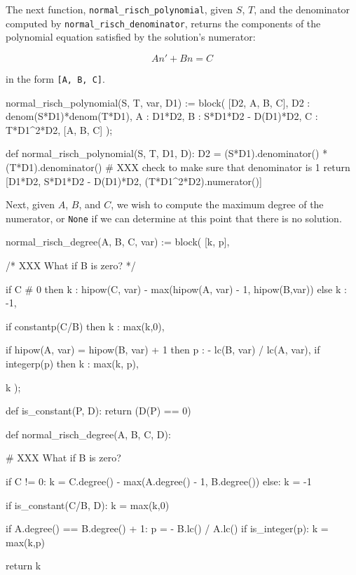 The next function, {\tt normal_risch_polynomial}, given $S$, $T$, and
the denominator computed by {\tt normal_risch_denominator},
returns the components of the polynomial equation
satisfied by the solution's numerator:

$$A n' + B n = C$$

in the form {\tt [A, B, C]}.

\begin{maximacode}
normal_risch_polynomial(S, T, var, D1) := block(
   [D2, A, B, C],
   D2 : denom(S*D1)*denom(T*D1),
   A : D1*D2,
   B : S*D1*D2 - D(D1)*D2,
   C : T*D1^2*D2,
   [A, B, C]
);
\end{maximacode}

\begin{sagecommon}
def normal_risch_polynomial(S, T, D1, D):
  D2 = (S*D1).denominator() * (T*D1).denominator()
  # XXX check to make sure that denominator is 1
  return [D1*D2, S*D1*D2 - D(D1)*D2, (T*D1^2*D2).numerator()]
\end{sagecommon}

Next, given $A$, $B$, and $C$, we wish to compute the
maximum degree of the numerator, or {\tt None} if we can
determine at this point that there is no solution.

\begin{maximacode}
normal_risch_degree(A, B, C, var) := block(
   [k, p],

   /* XXX What if B is zero? */

   if C # 0 then
      k : hipow(C, var) - max(hipow(A, var) - 1,
                              hipow(B,var))
   else
      k : -1,

   if constantp(C/B) then k : max(k,0),

   if hipow(A, var) = hipow(B, var) + 1
   then
      p : - lc(B, var) / lc(A, var),
      if integerp(p) then k : max(k, p),

   k
);
\end{maximacode}

\begin{sagecommon}
def is_constant(P, D):
   return (D(P) == 0)

def normal_risch_degree(A, B, C, D):

   # XXX What if B is zero?

   if C != 0:
      k = C.degree() - max(A.degree() - 1, B.degree())
   else:
      k = -1

   if is_constant(C/B, D):
      k = max(k,0)

   if A.degree() == B.degree() + 1:
      p = - B.lc() / A.lc()
      if is_integer(p):
         k = max(k,p)

   return k
\end{sagecommon}

